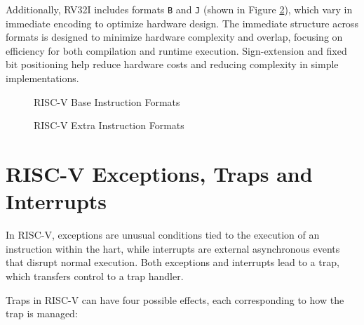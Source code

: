 Additionally, RV32I includes formats \texttt{B} and \texttt{J} (shown in Figure
\ref{fig:extrainstrformats}), which vary in immediate encoding to optimize
hardware design. The immediate structure across formats is designed to minimize hardware
complexity and overlap, focusing on efficiency for both compilation and runtime
execution. Sign-extension and fixed bit positioning help reduce hardware costs and
reducing complexity in simple implementations.

\begin{figure}[htbp]
  \centering
  \def\stackalignment{r}
  {\scriptsize }
  \caption{RISC-V Base Instruction Formats}
  \label{fig:instrformats}
\end{figure}

\begin{figure}[htbp]
  \centering
  \def\stackalignment{r} %
  {\scriptsize }
  \caption{RISC-V Extra Instruction Formats}
  \label{fig:extrainstrformats}
\end{figure}

\section{RISC-V Exceptions, Traps and Interrupts}
\label{sec:riscv_eti}

In RISC-V, exceptions are unusual conditions tied to the execution of an instruction
within the hart, while interrupts are external asynchronous events that disrupt
normal execution. Both exceptions and interrupts lead to a trap, which transfers
control to a trap handler.

Traps in RISC-V can have four possible effects, each corresponding to how the trap
is managed:

